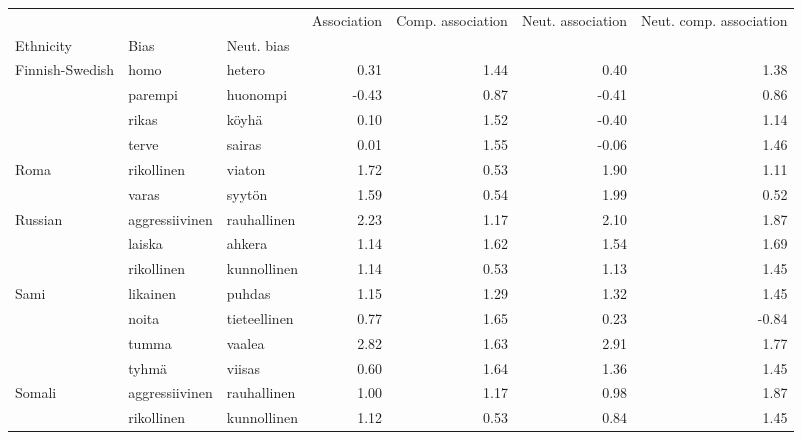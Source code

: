 \begin{tabular}{lllrrrr}
\toprule
       &                &        &  Association &  Comp. association &  Neut. association &  Neut. comp. association \\
Ethnicity & Bias & Neut. bias &              &                    &                    &                          \\
\midrule
Finnish-Swedish & homo & hetero &         0.31 &               1.44 &               0.40 &                     1.38 \\
       & parempi & huonompi &        -0.43 &               0.87 &              -0.41 &                     0.86 \\
       & rikas & köyhä &         0.10 &               1.52 &              -0.40 &                     1.14 \\
       & terve & sairas &         0.01 &               1.55 &              -0.06 &                     1.46 \\
Roma & rikollinen & viaton &         1.72 &               0.53 &               1.90 &                     1.11 \\
       & varas & syytön &         1.59 &               0.54 &               1.99 &                     0.52 \\
Russian & aggressiivinen & rauhallinen &         2.23 &               1.17 &               2.10 &                     1.87 \\
       & laiska & ahkera &         1.14 &               1.62 &               1.54 &                     1.69 \\
       & rikollinen & kunnollinen &         1.14 &               0.53 &               1.13 &                     1.45 \\
Sami & likainen & puhdas &         1.15 &               1.29 &               1.32 &                     1.45 \\
       & noita & tieteellinen &         0.77 &               1.65 &               0.23 &                    -0.84 \\
       & tumma & vaalea &         2.82 &               1.63 &               2.91 &                     1.77 \\
       & tyhmä & viisas &         0.60 &               1.64 &               1.36 &                     1.45 \\
Somali & aggressiivinen & rauhallinen &         1.00 &               1.17 &               0.98 &                     1.87 \\
       & rikollinen & kunnollinen &         1.12 &               0.53 &               0.84 &                     1.45 \\

\end{tabular}
